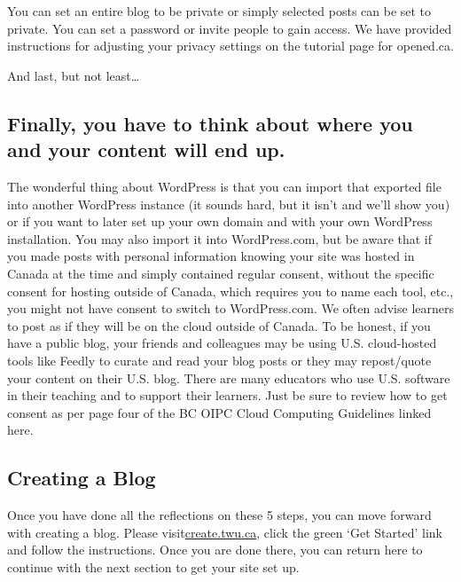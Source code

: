 \documentclass[
]{book}
\begin{document}
You can set an entire blog to be private or simply selected posts can be set to private. You can set a password or invite people to gain access. We have provided instructions for adjusting your privacy settings on the tutorial page for opened.ca.

And last, but not least\ldots{}

\hypertarget{finally-you-have-to-think-about-where-you-and-your-content-will-end-up.}{%
\subsection*{Finally, you have to think about where you and your content will end up.}\label{finally-you-have-to-think-about-where-you-and-your-content-will-end-up.}}

The wonderful thing about WordPress is that you can import that exported file into another WordPress instance (it sounds hard, but it isn't and we'll show you) or if you want to later set up your own domain and with your own WordPress installation. You may also import it into WordPress.com, but be aware that if you made posts with personal information knowing your site was hosted in Canada at the time and simply contained regular consent, without the specific consent for hosting outside of Canada, which requires you to name each tool, etc., you might not have consent to switch to WordPress.com. We often advise learners to post as if they will be on the cloud outside of Canada. To be honest, if you have a public blog, your friends and colleagues may be using U.S. cloud-hosted tools like Feedly to curate and read your blog posts or they may repost/quote your content on their U.S. blog. There are many educators who use U.S. software in their teaching and to support their learners. Just be sure to review how to get consent as per page four of the BC OIPC Cloud Computing Guidelines linked here.

\hypertarget{creating-a-blog}{%
\subsection*{Creating a Blog}\label{creating-a-blog}}

Once you have done all the reflections on these 5 steps, you can move forward with creating a blog. Please visit\href{https://create.twu.ca}{create.twu.ca}, click the green `Get Started' link and follow the instructions. Once you are done there, you can return here to continue with the next section to get your site set up.
\end{document}
